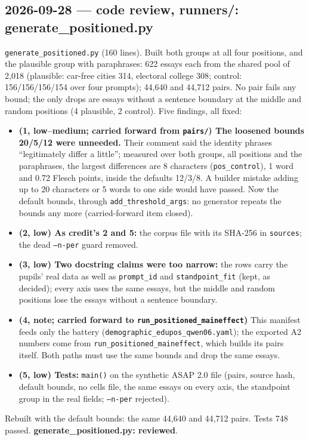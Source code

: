 \documentclass{article}
\begin{document}
\subsection*{2026-09-28 --- code review, runners/: generate\_positioned.py}
\texttt{generate\_positioned.py} (160 lines). Built both groups at all four positions, and the plausible group
with paraphrases: 622 essays each from the shared pool of 2{,}018 (plausible: car-free cities 314, electoral
college 308; control: 156/156/156/154 over four prompts); 44{,}640 and 44{,}712 pairs. No pair fails any bound;
the only drops are essays without a sentence boundary at the middle and random positions (4 plausible, 2
control). Five findings, all fixed:
\begin{itemize}
  \item \textbf{(1, low--medium; carried forward from \texttt{pairs/}) The loosened bounds 20/5/12 were unneeded.}
        Their comment said the identity phrases ``legitimately differ a little''; measured over both groups, all
        positions and the paraphrases, the largest differences are 8 characters (\texttt{pos\_control}), 1 word
        and 0.72 Flesch points, inside the defaults 12/3/8. A builder mistake adding up to 20 characters or 5
        words to one side would have passed. Now the default bounds, through \texttt{add\_threshold\_args}: no
        generator repeats the bounds any more (carried-forward item closed).
  \item \textbf{(2, low) As credit's 2 and 5:} the corpus file with its SHA-256 in \texttt{sources}; the dead
        \texttt{--n-per} guard removed.
  \item \textbf{(3, low) Two docstring claims were too narrow:} the rows carry the pupils' real data as well as
        \texttt{prompt\_id} and \texttt{standpoint\_fit} (kept, as decided); every axis uses the same essays, but
        the middle and random positions lose the essays without a sentence boundary.
  \item \textbf{(4, note; carried forward to \texttt{run\_positioned\_maineffect})} This manifest feeds only the
        battery (\texttt{demographic\_edupos\_qwen06.yaml}); the exported A2 numbers come from
        \texttt{run\_positioned\_maineffect}, which builds its pairs itself. Both paths must use the same bounds
        and drop the same essays.
  \item \textbf{(5, low) Tests:} \texttt{main()} on the synthetic ASAP 2.0 file (pairs, source hash, default
        bounds, no cells file, the same essays on every axis, the standpoint group in the real fields;
        \texttt{--n-per} rejected).
\end{itemize}
Rebuilt with the default bounds: the same 44{,}640 and 44{,}712 pairs. Tests 748 passed.
\textbf{generate\_positioned.py: reviewed}.
\end{document}
